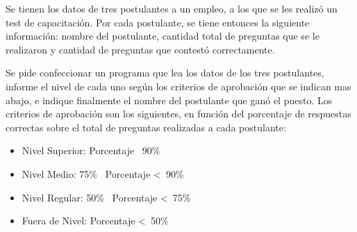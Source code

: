 Se tienen los datos de tres postulantes a un empleo, a los que se les realizó un test de capacitación. Por cada postulante, se tiene entonces la siguiente información:  nombre del postulante, cantidad total de preguntas que se le realizaron y cantidad de preguntas que contestó correctamente. 

Se pide confeccionar un programa que lea los datos de los tres postulantes, informe el nivel de cada uno según los criterios de aprobación que se indican mas abajo, e indique finalmente el nombre del postulante que ganó el puesto. Los criterios de aprobación son los siguientes, en función del porcentaje de respuestas correctas sobre el total de preguntas realizadas a cada postulante:

\begin{itemize}
\item Nivel Superior:       Porcentaje \geqslant\ 90\%
\item Nivel Medio:          75\% \leqslant\ Porcentaje <\ 90\%
\item Nivel Regular:        50\% \leqslant\ Porcentaje <\ 75\%
\item Fuera de Nivel:       Porcentaje <\ 50\%
\end{itemize}